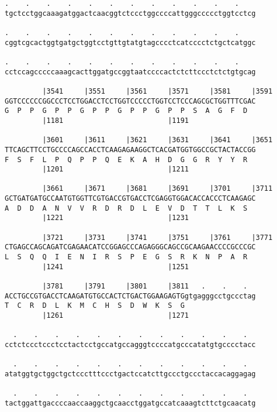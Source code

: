 \documentclass{article}
\begin{document}
\begin{Verbatim}
.    .    .    .    .    .    .    .    .    .    .    .    
tgctcctggcaaagatggactcaacggtctccctggccccattgggccccctggtcctcg
                                                            
.    .    .    .    .    .    .    .    .    .    .    .    
cggtcgcactggtgatgctggtcctgttgtatgtagcccctcatcccctctgctcatggc
                                                            
.    .    .    .    .    .    .    .    .    .    .    .    
cctccagcccccaaagcacttggatgccggtaatccccactctcttccctctctgtgcag
                                                            
         |3541     |3551     |3561     |3571     |3581     |3591
GGTCCCCCCGGCCCTCCTGGACCTCCTGGTCCCCCTGGTCCTCCCAGCGCTGGTTTCGAC
G  P  P  G  P  P  G  P  P  G  P  P  G  P  P  S  A  G  F  D  
         |1181                         |1191                
  
         |3601     |3611     |3621     |3631     |3641     |3651
TTCAGCTTCCTGCCCCAGCCACCTCAAGAGAAGGCTCACGATGGTGGCCGCTACTACCGG
F  S  F  L  P  Q  P  P  Q  E  K  A  H  D  G  G  R  Y  Y  R  
         |1201                         |1211                
  
         |3661     |3671     |3681     |3691     |3701     |3711
GCTGATGATGCCAATGTGGTTCGTGACCGTGACCTCGAGGTGGACACCACCCTCAAGAGC
A  D  D  A  N  V  V  R  D  R  D  L  E  V  D  T  T  L  K  S  
         |1221                         |1231                
  
         |3721     |3731     |3741     |3751     |3761     |3771
CTGAGCCAGCAGATCGAGAACATCCGGAGCCCAGAGGGCAGCCGCAAGAACCCCGCCCGC
L  S  Q  Q  I  E  N  I  R  S  P  E  G  S  R  K  N  P  A  R  
         |1241                         |1251                
  
         |3781     |3791     |3801     |3811   .    .    .  
ACCTGCCGTGACCTCAAGATGTGCCACTCTGACTGGAAGAGTGgtgagggcctgccctag
T  C  R  D  L  K  M  C  H  S  D  W  K  S  G                 
         |1261                         |1271                
  
  .    .    .    .    .    .    .    .    .    .    .    .  
cctctccctccctcctactcctgccatgccagggtccccatgcccatatgtgcccctacc
                                                            
  .    .    .    .    .    .    .    .    .    .    .    .  
atatggtgctggctgctccctttccctgactccatcttgccctgccctaccacaggagag
                                                            
  .    .    .    .    .    .    .    .    .    .    .    .  
tactggattgaccccaaccaaggctgcaacctggatgccatcaaagtcttctgcaacatg
                                                            

\end{Verbatim}
\end{document}
